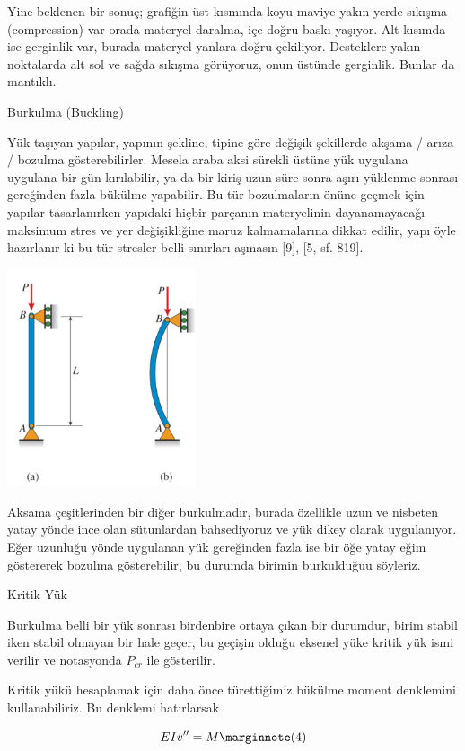 \documentclass[12pt,fleqn]{article}\usepackage{../../common}
\begin{document}
Yine beklenen bir sonuç; grafiğin üst kısmında koyu maviye yakın yerde sıkışma
(compression) var orada materyel daralma, içe doğru baskı yaşıyor. Alt kısımda
ise gerginlik var, burada materyel yanlara doğru çekiliyor. Desteklere yakın
noktalarda alt sol ve sağda sıkışma görüyoruz, onun üstünde gerginlik.  Bunlar
da mantıklı.

Burkulma (Buckling)

Yük taşıyan yapılar, yapının şekline, tipine göre değişik şekillerde akşama /
arıza / bozulma gösterebilirler. Mesela araba aksi sürekli üstüne yük uygulana
uygulana bir gün kırılabilir, ya da bir kiriş uzun süre sonra aşırı yüklenme
sonrası gereğinden fazla bükülme yapabilir. Bu tür bozulmaların önüne geçmek
için yapılar tasarlanırken yapıdaki hiçbir parçanın materyelinin dayanamayacağı
maksimum stres ve yer değişikliğine maruz kalmamalarına dikkat edilir, yapı öyle
hazırlanır ki bu tür stresler belli sınırları aşmasın [9], [5, sf. 819].

\includegraphics[width=15em]{phy_020_strs_06_02.jpg}

Aksama çeşitlerinden bir diğer burkulmadır, burada özellikle uzun ve nisbeten
yatay yönde ince olan sütunlardan bahsediyoruz ve yük dikey olarak uygulanıyor.
Eğer uzunluğu yönde uygulanan yük gereğinden fazla ise bir öğe yatay eğim
göstererek bozulma gösterebilir, bu durumda birimin burkulduğuu söyleriz.

Kritik Yük

Burkulma belli bir yük sonrası birdenbire ortaya çıkan bir durumdur, birim
stabil iken stabil olmayan bir hale geçer, bu geçişin olduğu eksenel yüke
kritik yük ismi verilir ve notasyonda $P_{cr}$ ile gösterilir.

Kritik yükü hesaplamak için daha önce türettiğimiz bükülme moment denklemini
kullanabiliriz. Bu denklemi hatırlarsak

$$
EI v'' = M
\mlabel{4}
$$
\end{document}
